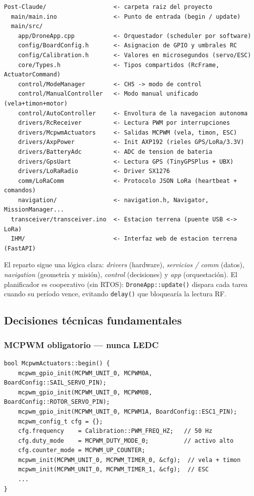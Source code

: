\documentclass[12pt,a4paper]{article}
\newcommand{\file}[1]{\texttt{#1}}
\begin{document}
\begin{lstlisting}[style=shell, caption={\'Arbol del proyecto (raiz = Post-Claude)}]
Post-Claude/                   <- carpeta raiz del proyecto
  main/main.ino                <- Punto de entrada (begin / update)
  main/src/
    app/DroneApp.cpp           <- Orquestador (scheduler por software)
    config/BoardConfig.h       <- Asignacion de GPIO y umbrales RC
    config/Calibration.h       <- Valores en microsegundos (servo/ESC)
    core/Types.h               <- Tipos compartidos (RcFrame, ActuatorCommand)
    control/ModeManager        <- CH5 -> modo de control
    control/ManualController   <- Modo manual unificado (vela+timon+motor)
    control/AutoController     <- Envoltura de la navegacion autonoma
    drivers/RcReceiver         <- Lectura PWM por interrupciones
    drivers/McpwmActuators     <- Salidas MCPWM (vela, timon, ESC)
    drivers/AxpPower           <- Init AXP192 (rieles GPS/LoRa/3.3V)
    drivers/BatteryAdc         <- ADC de tension de bateria
    drivers/GpsUart            <- Lectura GPS (TinyGPSPlus + UBX)
    drivers/LoRaRadio          <- Driver SX1276
    comm/LoRaComm              <- Protocolo JSON LoRa (heartbeat + comandos)
    navigation/                <- navigation.h, Navigator, MissionManager...
  transceiver/transceiver.ino  <- Estacion terrena (puente USB <-> LoRa)
  IHM/                         <- Interfaz web de estacion terrena (FastAPI)
\end{lstlisting}

El reparto sigue una l\'ogica clara: \emph{drivers} (hardware), \emph{servicios /
comm} (datos), \emph{navigation} (geometr\'ia y misi\'on), \emph{control}
(decisiones) y \emph{app} (orquestaci\'on). El planificador es cooperativo (sin
RTOS): \file{DroneApp::update()} dispara cada tarea cuando su per\'iodo vence,
evitando \texttt{delay()} que bloquear\'ia la lectura RF.

\subsection{Decisiones t\'ecnicas fundamentales}

\subsubsection{MCPWM obligatorio --- nunca LEDC}

\begin{lstlisting}[style=cpp, caption={McpwmActuators.cpp -- inicializacion MCPWM}]
bool McpwmActuators::begin() {
    mcpwm_gpio_init(MCPWM_UNIT_0, MCPWM0A, BoardConfig::SAIL_SERVO_PIN);
    mcpwm_gpio_init(MCPWM_UNIT_0, MCPWM0B, BoardConfig::ROTOR_SERVO_PIN);
    mcpwm_gpio_init(MCPWM_UNIT_0, MCPWM1A, BoardConfig::ESC1_PIN);
    mcpwm_config_t cfg = {};
    cfg.frequency    = Calibration::PWM_FREQ_HZ;   // 50 Hz
    cfg.duty_mode    = MCPWM_DUTY_MODE_0;          // activo alto
    cfg.counter_mode = MCPWM_UP_COUNTER;
    mcpwm_init(MCPWM_UNIT_0, MCPWM_TIMER_0, &cfg);  // vela + timon
    mcpwm_init(MCPWM_UNIT_0, MCPWM_TIMER_1, &cfg);  // ESC
    ...
}
\end{lstlisting}
\end{document}
